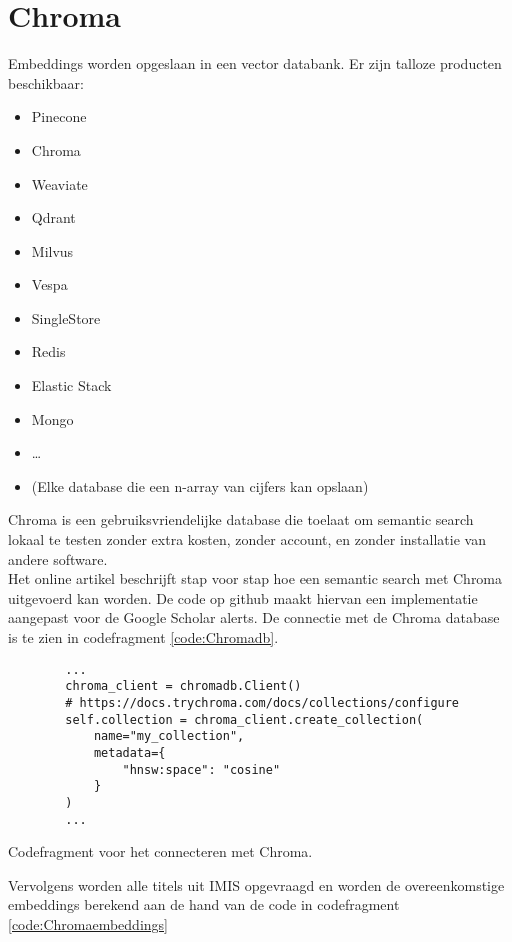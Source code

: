 \section{Chroma}
Embeddings worden opgeslaan in een vector databank. Er zijn talloze producten beschikbaar:
\begin{itemize}
    \item Pinecone
    \item Chroma
    \item Weaviate
    \item Qdrant
    \item Milvus
    \item Vespa
    \item SingleStore
    \item Redis
    \item Elastic Stack
    \item Mongo
    \item …
    \item (Elke database die een n-array van cijfers kan opslaan)
\end{itemize}
Chroma \autocite{Chroma2025} is een gebruiksvriendelijke database die toelaat om semantic search lokaal te testen zonder extra kosten, zonder account, en zonder installatie van andere software.\\
Het online artikel \textcite{Usechroma2025} beschrijft stap voor stap hoe een semantic search met Chroma uitgevoerd kan worden. 
De code op github \textcite{Depaepechroma2025} maakt hiervan een implementatie aangepast voor de Google Scholar alerts.
De connectie met de Chroma database is te zien in codefragment \ref{code:Chromadb}.
\begin{listing}
    \begin{verbatim}
        ...
        chroma_client = chromadb.Client()
        # https://docs.trychroma.com/docs/collections/configure
        self.collection = chroma_client.create_collection(
            name="my_collection",
            metadata={
                "hnsw:space": "cosine"
            }
        )
        ...
    \end{verbatim}
    \caption[Chroma codefragment]{Codefragment voor het connecteren met Chroma.}
    \label{code:Chromadb}
\end{listing}
Vervolgens worden alle titels uit IMIS opgevraagd en worden de overeenkomstige embeddings berekend aan de hand van de code in codefragment \ref{code:Chromaembeddings}

